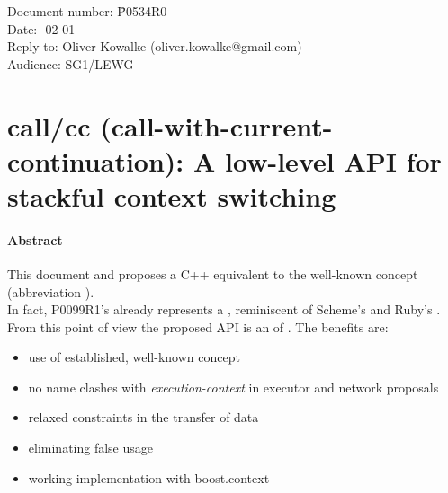 \documentclass[fontsize=10pt,paper=A4,pagesize,DIV=15]{scrartcl}
\begin{document}
\small
\begin{tabbing}
    Document number: \= P0534R0\\
    Date:            -02-01\\
    Reply-to:        \> Oliver Kowalke (oliver.kowalke@gmail.com)\\
    Audience:        \> SG1/LEWG\\
\end{tabbing}

\section*{call/cc (call-with-current-continuation): A low-level API for stackful context switching}


\tableofcontents


\paragraph*{Abstract}
This document  and proposes a C++
equivalent to the well-known concept \callcc (abbreviation \cc).\\
In fact, P0099R1's \ectx already represents a ,
reminiscent of Scheme's\cite{schemecallcc} and Ruby's\cite{rubycallcc} \cc.
From this point of view the proposed API is an  of \ectx. The
benefits are:
\begin{itemize}
    \item   use of established, well-known concept
    \item   no name clashes with \emph{execution-context} in
            executor and network proposals
    \item   relaxed constraints in the transfer of data
    \item   eliminating false usage
    \item   working implementation with boost.context\cite{bcontext}
\end{itemize}














\end{document}
